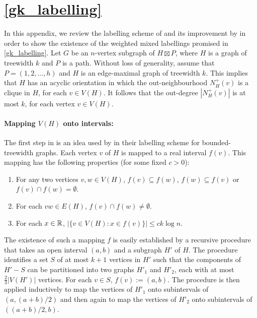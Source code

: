 \documentclass{patmorin}
\renewcommand{\le}{\leqslant}
\newcommand{\defin}[1]{\emph{\textcolor{brightmaroon}{#1}}}
\begin{document}
\setlength{\bibsep}{0.3ex plus 0.1ex minus 0.1ex}



  \appendix

\section{\cref{gk_labelling}}
  \label{weighted_product_proof}

  In this appendix, we review the labelling scheme of \citet{dujmovic.esperet.ea:adjacency} and its improvement by \citet{gawrychowski.janczewski:simpler} in order to show the existence of the weighted mixed labellings promised in \cref{gk_labelling}.
  Let $G$ be an $n$-vertex subgraph of $H\boxtimes P$, where $H$ is a graph of treewidth $k$ and $P$ is a path. Without loss of generality, assume that $P=(1,2,\dots,h)$ and $H$ is an edge-maximal graph of treewidth $k$.  This implies that $H$ has an acyclic orientation in which the out-neighbourhood $N^+_H(v)$ is a clique in $H$, for each $v\in V(H)$.
  It follows that the out-degree $|N^+_H(v)|$ is at most $k$, for each vertex $v\in V(H)$.

  \paragraph{\boldmath Mapping $V(H)$ onto intervals:}
  The first step in \cite{dujmovic.esperet.ea:adjacency} is an idea used by \citet{gavoille.labourel:shorter} in their labelling scheme for bounded-treewidth graphs.
  Each vertex $v$ of $H$ is mapped to a real interval \defin{$f(v)$}.
  This mapping has the following properties (for some fixed $c>0$):
  \begin{enumerate}
      \item\label{nested_or_disjoint} For any two vertices $v,w\in V(H)$, $f(v)\subseteq f(w)$, $f(w)\subseteq f(v)$ or $f(v)\cap f(w)=\emptyset$.
      \item\label{intersection_subgraph} For each $vw\in E(H)$, $f(v)\cap f(w)\neq\emptyset$.
      \item\label{thin} For each $x\in \mathbb{R}$, $|\{v\in V(H):x\in f(v)\}|\le ck\log n$.
  \end{enumerate}

  The existence of such a mapping $f$ is easily established by a recursive procedure that takes an open interval $(a,b)$ and a subgraph $H'$ of $H$.
  The procedure identifies a set $S$ of at most $k+1$ vertices in $H'$ such that the components of $H'-S$ can be partitioned into two graphs $H'_1$ and $H'_2$, each with at most $\tfrac{2}{3}|V(H')|$ vertices.
  For each $v\in S$, $f(v):=(a,b)$.  The procedure is then applied inductively to map the vertices of $H'_1$ onto subintervals of $(a,(a+b)/2)$ and then again to map the vertices of $H'_2$ onto subintervals of $((a+b)/2,b)$.
\end{document}
